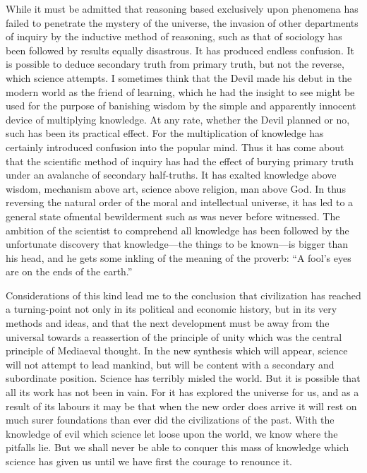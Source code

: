 \documentclass{book}
\begin{document}
While it must be admitted that reasoning based exclusively upon phenomena has failed to penetrate the mystery of the universe, the invasion of other departments of inquiry by the inductive method of reasoning, such as that of sociology has been followed by results equally disastrous. It has produced endless confusion. It is possible to deduce secondary truth from primary truth, but not the reverse, which science attempts. I sometimes think that the Devil made his debut in the modern world as the friend of learning, which he had the insight to see might be used for the purpose of banishing wisdom by the simple and apparently innocent device of multiplying knowledge. At any rate, whether the Devil planned or no, such has been its practical effect. For the multiplication of knowledge has certainly introduced confusion into the popular mind. Thus it has come about that the scientific method of inquiry has had the effect of burying primary truth under an avalanche of secondary half-truths. It has exalted knowledge above wisdom, mechanism above art, science above religion, man above God. In thus reversing the natural order of the moral and intellectual universe, it has led to a general state ofmental bewilderment such as was never before witnessed. The ambition of the scientist to comprehend all knowledge has been followed by the unfortunate discovery that knowledge—the things to be known—is bigger than his head, and he gets some inkling of the meaning of the proverb: “A fool’s eyes are on the ends of the earth.”

Considerations of this kind lead me to the conclusion that civilization has reached a turning-point not only in its political and economic history, but in its very methods and ideas, and that the next development must be away from the universal towards a reassertion of the principle of unity which was the central principle of Mediaeval thought. In the new synthesis which will appear, science will not attempt to lead mankind, but will be content with a secondary and subordinate position. Science has terribly misled the world. But it is possible that all its work has not been in vain. For it has explored the universe for us, and as a result of its labours it may be that when the new order does arrive it will rest on much surer foundations than ever did the civilizations of the past. With the knowledge of evil which science let loose upon the world, we know where the pitfalls lie. But we shall never be able to conquer this mass of knowledge which science has given us until we have first the courage to renounce it.
\end{document}
